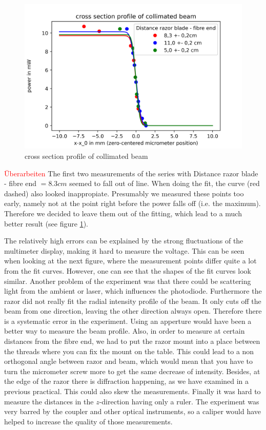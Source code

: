 \documentclass{article}
\begin{document}
\begin{figure}
\includegraphics[width=\textwidth]{cross section profile of collimated beam.png}
\caption{cross section profile of collimated beam}
\label{part_a_fig} %
\end{figure}

\textcolor{red}{Überarbeiten}
The first two measurements of the series with Distance razor blade - fibre end $= 8.3 cm$ seemed to fall out of line. When doing the fit, the curve (red dashed) also looked inappropiate. Presumably we measured these points too early, namely not at the point right before the power falls off (i.e. the maximum). Therefore we decided to leave them out of the fitting, which lead to a much better result (see figure \ref{part_a_fig}).

The relatively high errors can be explained by the strong fluctuations of the multimeter display, making it hard to measure the voltage. This can be seen when looking at the next figure, where the measurement points differ quite a lot from the fit curves. However, one can see that the shapes of the fit curves look similar. Another problem of the experiment was that there could be scattering light from the ambient or laser, which influences the photodiode. Furthermore the razor did not really fit the radial intensity profile of the beam. It only cuts off the beam from one direction, leaving the other direction always open. Therefore there is a systematic error in the experiment. Using an apperture would have been a better way to measure the beam profile. Also, in order to measure at certain distances from the fibre end, we had to put the razor mount into a place between the threads where you can fix the mount on the table. This could lead to a non orthogonal angle between razor and beam, which would mean that you have to turn the micrometer screw more to get the same decrease of intensity. Besides, at the edge of the razor there is diffraction happening, as we have examined in a previous practical. This could also skew the measurements. Finally it was hard to measure the distances in the $z$-direction having only a ruler. The experiment was very barred by the coupler and other optical instruments, so a caliper would have helped to increase the quality of those measurements.
\end{document}
